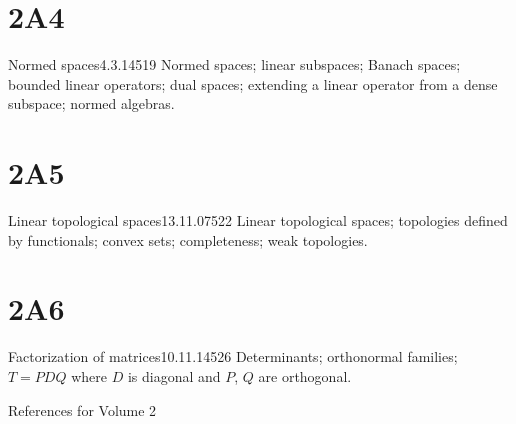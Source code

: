 \section{2A4}{Normed spaces}{4.3.14}{519}{}
{Normed spaces;  linear subspaces;  Banach spaces;
bounded linear operators;  dual spaces;  extending a linear operator
from a dense subspace;  normed algebras.}

\section{2A5}{Linear topological spaces}{13.11.07}{522}{}
{Linear topological spaces;  topologies defined by functionals;
convex sets;  completeness;  weak topologies.}

\section{2A6}{Factorization of matrices}{10.11.14}{526}{}
{Determinants;  orthonormal families;  $T=PDQ$ where $D$ is
diagonal and $P$, $Q$ are orthogonal.}



\medskip

References for Volume 2 





